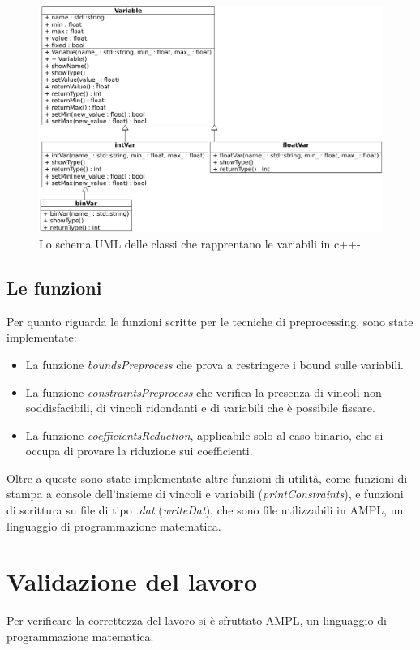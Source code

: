\documentclass{article}
\begin{document}
\begin{center}
\begin{figure}
\includegraphics[scale=0.38]{uml.png}
\caption{\footnotesize{Lo schema UML delle classi che rapprentano le variabili in c++-}}
\label{UML}
\end{figure}
\end{center}
\subsection{Le funzioni}
Per quanto riguarda le funzioni scritte per le tecniche di preprocessing, sono state implementate:

\begin{itemize}
\item La funzione \textit{boundsPreprocess} che prova a restringere i bound sulle variabili.
\item La funzione \textit{constraintsPreprocess} che verifica la presenza di vincoli
non soddisfacibili, di vincoli ridondanti e di variabili che è possibile fissare.
\item La funzione \textit{coefficientsReduction}, applicabile solo al caso binario, che si occupa di provare la riduzione sui coefficienti.
\end{itemize}

Oltre a queste sono state implementate altre funzioni di utilità, come funzioni di stampa a console dell'insieme di vincoli e variabili (\textit{printConstraints}), e funzioni di scrittura su file di tipo \textit{.dat} (\textit{writeDat}), che sono file utilizzabili in AMPL, un linguaggio di programmazione matematica.

\section{Validazione del lavoro}
Per verificare la correttezza del lavoro si è sfruttato AMPL, un linguaggio di programmazione matematica.
\end{document}
